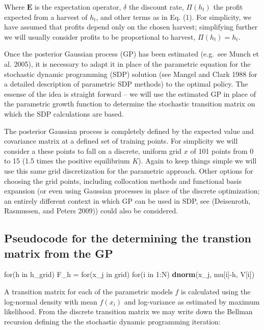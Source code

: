 \documentclass[author-year, review]{elsarticle} %
\newenvironment{Shaded}{}{}
\newcommand{\KeywordTok}[1]{\textcolor[rgb]{0.00,0.44,0.13}{\textbf{{#1}}}}
\newcommand{\DecValTok}[1]{\textcolor[rgb]{0.25,0.63,0.44}{{#1}}}
\newcommand{\StringTok}[1]{\textcolor[rgb]{0.25,0.44,0.63}{{#1}}}
\newcommand{\NormalTok}[1]{{#1}}
\begin{document}
Where $\mathbf{E}$ is the expectation operator, $\delta$ the discount
rate, $\Pi(h_t)$ the profit expected from a harvest of $h_t$, and other
terms as in Eq. (1). For simplicity, we have assumed that profits depend
only on the chosen harvest; simplifying further we will usually consider
profits to be proportional to harvest, $\Pi(h_t) = h_t$.

Once the posterior Gaussian process (GP) has been estimated (e.g.~see
Munch et al. 2005), it is necessary to adapt it in place of the
parametric equation for the stochastic dynamic programming (SDP)
solution (see Mangel and Clark 1988 for a detailed description of
parametric SDP methods) to the optimal policy. The essense of the idea
is straight forward -- we will use the estimated GP in place of the
parametric growth function to determine the stochastic transition matrix
on which the SDP calculations are based.

The posterior Gaussian process is completely defined by the expected
value and covariance matrix at a defined set of training points. For
simplicity we will consider a these points to fall on a discrete,
uniform grid $x$ of 101 points from 0 to 15 (1.5 times the positive
equilibrium $K$). Again to keep things simple we will use this same grid
discretization for the parametric approach. Other options for choosing
the grid points, including collocation methods and functional basis
expansion (or even using Gaussian processes in place of the discrete
optimization; an entirely different context in which GP can be used in
SDP, see (Deisenroth, Rasmussen, and Peters 2009)) could also be
considered.

\subsection{Pseudocode for the determining the transtion matrix from the
GP}

\begin{Shaded}
\begin{Highlighting}[]
\NormalTok{for(h in h_grid)}
  \NormalTok{F_h =}\StringTok{ }\NormalTok{for(x_j in grid)}
          \NormalTok{for(i in }\DecValTok{1}\NormalTok{:N) }
            \KeywordTok{dnorm}\NormalTok{(x_j, mu[i]-h, V[i])}
\end{Highlighting}
\end{Shaded}

A transition matrix for each of the parametric models $f$ is calculated
using the log-normal density with mean $f(x_i)$ and log-variance as
estimated by maximum likelihood. From the discrete transition matrix we
may write down the Bellman recursion defining the the stochastic dynamic
programming iteration:
\end{document}
